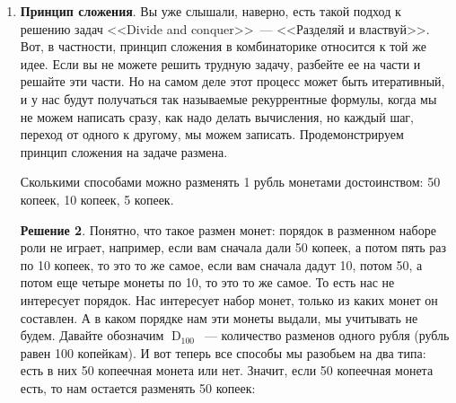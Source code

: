 \documentclass[russian]{lecture-notes}
\theoremstyle{definition}
\newtheorem*{solution}{Решение}
\DeclareMathOperator{\KRAZ}{D}
\newcommand{\DN}[1]{\KRAZ_{#1}}
\begin{document}
\begin{enumerate}
\begin{solution}
			\[
				|A \times D \times D \times D \times A \times A| = |A| \cdot |D| \cdot |D| \cdot |D| \cdot |A| \cdot |A|
			\]
			
			В правой части выражения мы перемножаем числа. В левой части выражения множества менять местами нельзя, иначе получатся другие наборы, а вот в правой $|A|$~--- количество букв, $|D|$~--- количество цифр, и множители можно переставлять:
			
			\[
			|A| \cdot |D| \cdot |D| \cdot |D| \cdot |A| \cdot |A| = |A|^3 \cdot |B|^3
			\]
			
			Если использовать около 20 букв и 10 цифр, то количество номеров легко оценить:
			
			\[
			|A|^3 \cdot |B|^3 \approx 20^3 \cdot 10^3 = 8000000
			\]
		\end{solution}
		
		Следующим будет правило сложения или принцип сложения.
		
		
		\item \textbf{Принцип сложения}. Вы уже слышали, наверно, есть такой подход к решению задач <<Divide and conquer>>~--- <<Разделяй и властвуй>>. Вот, в частности, принцип сложения в комбинаторике относится к той же идее. Если вы не можете решить трудную задачу, разбейте ее на части и решайте эти части. Но на самом деле этот процесс может быть итеративный, и у нас будут получаться так называемые рекуррентные формулы, когда мы не можем написать сразу, как надо делать вычисления, но каждый шаг, переход от одного к другому, мы можем записать. Продемонстрируем принцип сложения на задаче размена.
		
		
		\begin{problem}
			Сколькими способами можно разменять 1 рубль монетами достоинством: 50 копеек, 10 копеек, 5 копеек.
		\end{problem}
			
		\begin{solution}
			Понятно, что такое размен монет: порядок в разменном наборе роли не играет, например, если вам сначала дали 50 копеек, а потом пять раз по 10 копеек, то это то же самое, если вам сначала дадут 10, потом 50, а потом еще четыре монеты по 10, то это то же самое. То есть нас не интересует порядок. Нас интересует набор монет, только из каких монет он составлен. А в каком порядке нам эти монеты выдали, мы учитывать не будем. Давайте обозначим $\DN{100}$~--- количество разменов одного рубля (рубль равен 100 копейкам). И вот теперь все способы мы разобьем на два типа: есть в них 50 копеечная монета или нет. Значит, если 50 копеечная монета есть, то нам остается разменять 50 копеек:
			

\end{solution}
\end{enumerate}
\end{document}

